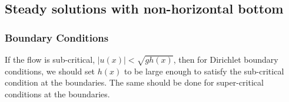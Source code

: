 \subsection{Steady solutions with non-horizontal bottom} %
\label{sub:steady_solutions_with_non_horizontal_bottom}

\subsubsection{Boundary Conditions} %
\label{ssub:boundary_conditions}

If the flow is sub-critical, $|u(x)|<\sqrt{gh(x)}$, then for Dirichlet boundary conditions, we should set $h(x)$ to be large enough to satisfy the sub-critical condition at the boundaries.  The same should be done for super-critical conditions at the boundaries.

